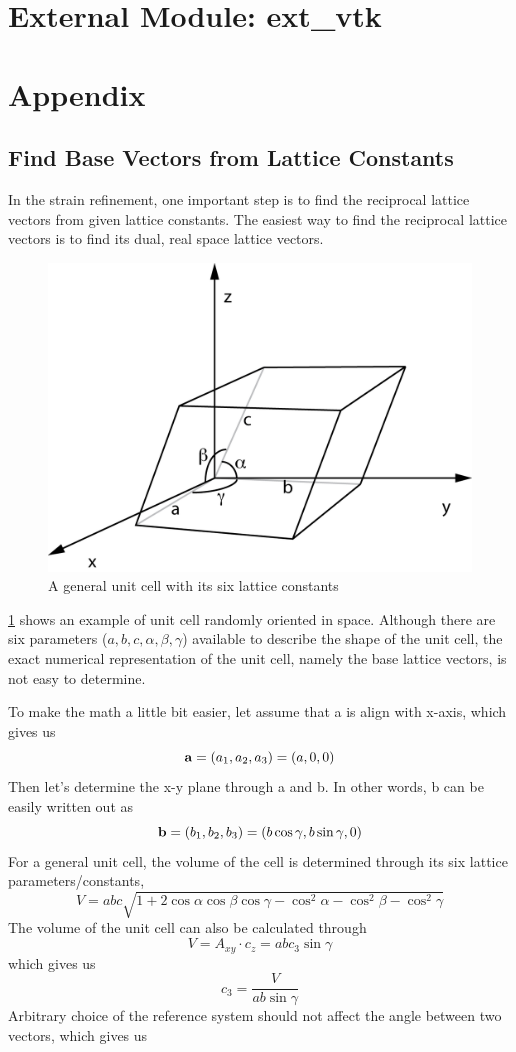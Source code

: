 \documentclass[12pt]{scrartcl}
\begin{document}
\section{External Module: ext\_vtk}

\section{Appendix}
\subsection{Find Base Vectors from Lattice Constants}
\label{sec:lc2bv}
In the strain refinement, one important step is to find the reciprocal lattice vectors from given lattice constants.
The easiest way to find the reciprocal lattice vectors is to find its dual, real space lattice vectors.

\begin{figure}[htp]
\centering
\includegraphics[width=.7\linewidth]{UnitCell.png}
\caption{A general unit cell with its six lattice constants}
\label{fig:unitcell}
\end{figure}

\cref{fig:unitcell} shows an example of unit cell randomly oriented in space.
Although there are six parameters ($a,b,c, \alpha, \beta, \gamma$) available to describe the shape of the unit cell, the exact numerical representation of the unit cell, namely the base lattice vectors, is not easy to determine.

To make the math a little bit easier, let assume that \vctr a is align with x-axis, which gives us
\[
	\mathbf{a} = (a_1, a_2, a_3) = (a, 0, 0)
\]
Then let's determine the x-y plane through \vctr a and \vctr b.
In other words, \vctr b can be easily written out as
\[
	\mathbf{b} = (b_1, b_2, b_3) = (b\cos\gamma, b\sin\gamma, 0)
\]
For a general unit cell, the volume of the cell is determined through its six lattice parameters/constants,
\[
	V = abc\sqrt{1 + 2\cos\alpha\cos\beta\cos\gamma - \cos^2\alpha-\cos^2\beta-\cos^2\gamma}
\]
The volume of the unit cell can also be calculated through
\[
	V = A_{xy}\cdot c_z = abc_3\sin\gamma
\]
which gives us
\[
	c_3 = \dfrac{V}{ab\sin\gamma}
\]
Arbitrary choice of the reference system should not affect the angle between two vectors, which gives us
\end{document}
